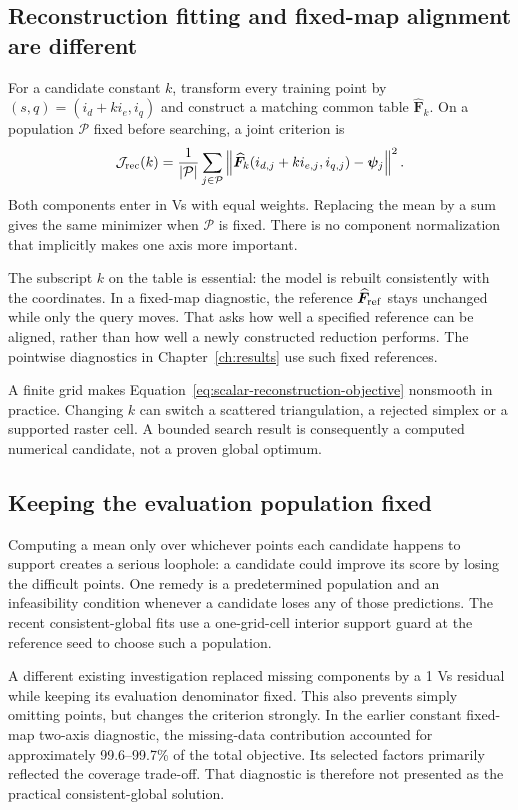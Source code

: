 \subsection{Reconstruction fitting and fixed-map alignment are different}
For a candidate constant $k$, transform every training point by $(s,q)=(i_d+ki_e,i_q)$ and construct a matching common table $\widehat{\bm F}_k$. On a population $\mathcal P$ fixed before searching, a joint criterion is
\begin{equation}\label{eq:scalar-reconstruction-objective}
\mathcal J_{\rm rec}(k)=\frac1{|\mathcal P|}
\sum_{j\in\mathcal P}
\left\lVert\widehat{\bm F}_k(i_{d,j}+ki_{e,j},i_{q,j})-\bm\psi_j\right\rVert^2.
\end{equation}
Both components enter in Vs with equal weights. Replacing the mean by a sum gives the same minimizer when $\mathcal P$ is fixed. There is no component normalization that implicitly makes one axis more important.

The subscript $k$ on the table is essential: the model is rebuilt consistently with the coordinates. In a fixed-map diagnostic, the reference $\widehat{\bm F}_{\rm ref}$ stays unchanged while only the query moves. That asks how well a specified reference can be aligned, rather than how well a newly constructed reduction performs. The pointwise diagnostics in Chapter~\ref{ch:results} use such fixed references.

A finite grid makes Equation~\eqref{eq:scalar-reconstruction-objective} nonsmooth in practice. Changing $k$ can switch a scattered triangulation, a rejected simplex or a supported raster cell. A bounded search result is consequently a computed numerical candidate, not a proven global optimum.

\subsection{Keeping the evaluation population fixed}
Computing a mean only over whichever points each candidate happens to support creates a serious loophole: a candidate could improve its score by losing the difficult points. One remedy is a predetermined population and an infeasibility condition whenever a candidate loses any of those predictions. The recent consistent-global fits use a one-grid-cell interior support guard at the reference seed to choose such a population.

A different existing investigation replaced missing components by a 1 Vs residual while keeping its evaluation denominator fixed. This also prevents simply omitting points, but changes the criterion strongly. In the earlier constant fixed-map two-axis diagnostic, the missing-data contribution accounted for approximately 99.6--99.7\% of the total objective. Its selected factors primarily reflected the coverage trade-off. That diagnostic is therefore not presented as the practical consistent-global solution.

